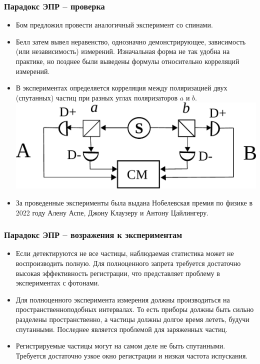 \documentclass[10pt]{beamer}
\begin{document}
\begin{frame}[label=EPR-experiment]%
  \frametitle{Парадокс ЭПР -- проверка}

  \begin{itemize}
    \item Бом предложил провести аналогичный эксперимент со спинами.
    \item Белл затем вывел неравенство, однозначно демонстрирующее, 
      зависимость (или независимость) измерений. Изначальная форма не 
      так удобна на практике, но позднее были выведены формулы 
      относительно корреляций измерений.
    \item В экспериментах определяется корреляция между поляризацией 
      двух (спутанных) частиц при разных углах поляризаторов $a$ и $b$.
      \\\hfill\includegraphics[width=.5\linewidth]{figures/bell-test}
      \hfill\null
    \item За проведенные эксперименты была выдана Нобелевская премия по 
      физике в 2022 году Алену Аспе, Джону Клаузеру и Антону Цайлингеру.
  \end{itemize}
\end{frame}%

\begin{frame}[label=EPR-experiment-opposition]%
  \frametitle{Парадокс ЭПР -- возражения к экспериментам}

  \begin{itemize}
    \item Если детектируются не все частицы, наблюдаемая статистика 
      может не воспроизводить полную. Для полноценного запрета требуется 
      достаточно высокая эффективность регистрации, что представляет 
      проблему в экспериментах с фотонами.

    \item Для полноценного эксперимента измерения должны производиться 
      на пространственноподобных интервалах. То есть приборы должны быть 
      сильно разделены пространственно, а частицы должны долгое время 
      лететь, будучи спутанными. Последнее является проблемой для 
      заряженных частиц.

    \item Регистрируемые частицы могут на самом деле не быть спутанными. 
      Требуется достаточно узкое окно регистрации и низкая частота 
      испускания.
  \end{itemize}
\end{frame}%
\end{document}
